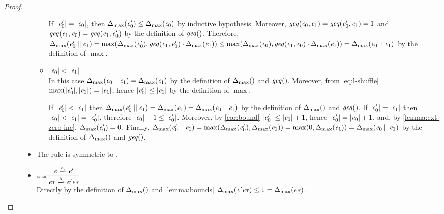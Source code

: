 \begin{proof}
\begin{description}
\begin{itemize}
\begin{itemize}
                 If ${\mid}{\mathit {e}_0'}{\mid}={\mid}{\mathit {e}_0}{\mid}$, then ${\Delta_{\max}}({\mathit {e}_0'})\leq{\Delta_{\max}}({\mathit {e}_0})$ by inductive hypothesis. Moreover,
                 $\mathit{geq}({\mathit {e}_0},{\mathit {e}_1})=\mathit{geq}({\mathit {e}'_0},{\mathit {e}_1})=1$ and $\mathit{geq}({\mathit {e}_1},{\mathit {e}_0})=\mathit{geq}({\mathit {e}_1},{\mathit {e}'_0})$ by the definition of $\mathit{geq}()$.
                 Therefore, ${\Delta_{\max}}({\mathit {e}_0'\mathbin{||}\mathit {e}_1})=\max({\Delta_{\max}}({\mathit {e}'_0}),\mathit{geq}({\mathit {e}_1},{\mathit {e}_0'})\cdot{\Delta_{\max}}({\mathit {e}_1}))\leq\max({\Delta_{\max}}({\mathit {e}_0}),\mathit{geq}({\mathit {e}_1},{\mathit {e}_0})\cdot{\Delta_{\max}}({\mathit {e}_1}))={\Delta_{\max}}({\mathit {e}_0\mathbin{||}\mathit {e}_1})$ by the definition of $\max$.
           \item ${\mid}{\mathit {e}_0}{\mid}<{\mid}{\mathit {e}_1}{\mid}$\\
                 In this case ${\Delta_{\max}}({\mathit {e}_0\mathbin{||}\mathit {e}_1})={\Delta_{\max}}({\mathit {e}_1})$ by the definition of ${\Delta_{\max}}({})$ and $\mathit{geq}()$. Moreover, from \cref{eq:l-shuffle} $\max({\mid}{\mathit {e}_0'}{\mid},{\mid}{\mathit {e}_1}{\mid})={\mid}{\mathit {e}_1}{\mid}$, hence ${\mid}{\mathit {e}_0'}{\mid}\leq{\mid}{\ensuremath{\mathit {e}}_1}{\mid}$ by the definition of $\max$.

                 If ${\mid}{\mathit {e}_0'}{\mid}<{\mid}{\mathit {e}_1}{\mid}$ then ${\Delta_{\max}}({\mathit {e}_0'\mathbin{||}\mathit {e}_1})={\Delta_{\max}}({\mathit {e}_1})={\Delta_{\max}}({\mathit {e}_0\mathbin{||}\mathit {e}_1})$ by the definition of ${\Delta_{\max}}({})$ and $\mathit{geq}()$. If ${\mid}{\mathit {e}_0'}{\mid}={\mid}{\mathit {e}_1}{\mid}$ then ${\mid}{\mathit {e}_0}{\mid}<{\mid}{\mathit {e}_1}{\mid}={\mid}{\mathit {e}_0'}{\mid}$, therefore ${\mid}{\mathit {e}_0}{\mid}+1\leq{\mid}{\ensuremath{\mathit {e}}_0'}{\mid}$. Moreover, by \cref{cor:bound} ${\mid}{\mathit {e}'_0}{\mid}\leq{\mid}{\ensuremath{\mathit {e}}_0}{\mid}+1$, hence ${\mid}{\mathit {e}_0'}{\mid}={\mid}{\mathit {e}_0}{\mid}+1$, and, by \cref{lemma:ext-zero-inc}, ${\Delta_{\max}}({\mathit {e}_0'})=0$. Finally,
                 ${\Delta_{\max}}({\mathit {e}_0'\mathbin{||}\mathit {e}_1})=\max({\Delta_{\max}}({\mathit {e}_0'}),{\Delta_{\max}}({\mathit {e}_1}))=\max(0,{\Delta_{\max}}({\mathit {e}_1}))={\Delta_{\max}}({\mathit {e}_0\mathbin{||}\mathit {e}_1})$ by the definition of ${\Delta_{\max}}({})$ and $\mathit{geq}()$.
          \end{itemize}


    \item The rule  is symmetric to .
    \item $\Rule{star}{\re\parDer{\sym}\re'}{\starop{\re}\parDer{\sym}\re'\catop\starop{\re}}{}$\\[2ex]
          Directly by the definition of ${\Delta_{\max}}({})$ and \cref{lemma:bounds}
          ${\Delta_{\max}}({\mathit {e}'{\mathit {e}}*})\leq 1={\Delta_{\max}}({{\mathit {e}}*})$.
   \end{itemize}
 \end{description}
\end{proof}


